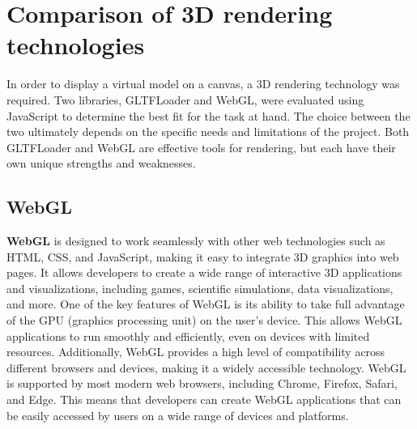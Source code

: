 \section{Comparison of 3D rendering technologies}
In order to display a virtual model on a canvas, a 3D rendering technology was required. Two libraries, 
GLTFLoader and WebGL, were evaluated using JavaScript to determine the best fit for the task at hand. 
The choice between the two ultimately depends on the specific needs and limitations of the project. 
Both GLTFLoader and WebGL are effective tools for rendering, but each have their own 
unique strengths and weaknesses.

\subsection{WebGL}
\textbf{WebGL} is designed to work seamlessly with other web technologies such as HTML, CSS, and JavaScript, 
making it easy to integrate 3D graphics into web pages. It allows developers to create a wide range 
of interactive 3D applications and visualizations, including games, scientific 
simulations, data visualizations, and more.
One of the key features of WebGL is its ability to take full advantage of the GPU 
(graphics processing unit) on the user's device. This allows WebGL applications to 
run smoothly and efficiently, even on devices with limited resources. Additionally, WebGL provides 
a high level of compatibility across different browsers and devices, making it a widely accessible technology.
WebGL is supported by most modern web browsers, including Chrome, Firefox, Safari, and Edge. 
This means that developers can create WebGL applications that can be easily accessed by 
users on a wide range of devices and platforms. \cite{WebGL}

